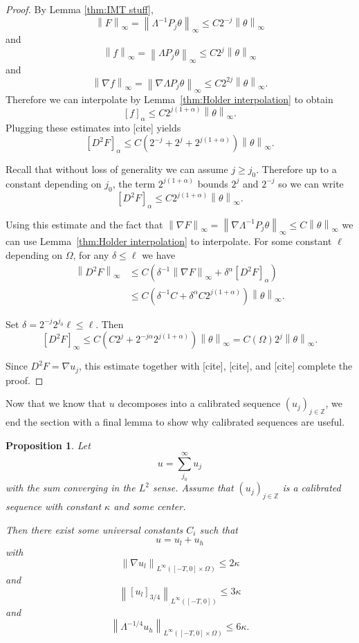 \documentclass[11pt]{amsart}
\newtheorem{proposition}[theorem]{Proposition}
\theoremstyle{remark}
\theoremstyle{definition}
\newcommand{\Z}{\mathbb{Z}}
\newcommand{\norm}[1]{\left\lVert#1\right\rVert}
\newcommand{\paren}[1]{\left( #1 \right)}
\newcommand{\bracket}[1]{\left[ #1 \right]}
\newcommand{\grad}{\nabla}
\newcommand{\n}{^{-1}}
\newcommand{\ulow}{u_l}
\newcommand{\uhigh}{u_h}
\begin{document}
\begin{proof}
By Lemma \ref{thm:IMT stuff},
\[ \norm{F}_\infty = \norm{\Lambda^{-1} P_j \theta}_\infty \leq C 2^{-j} \norm{\theta}_\infty \]
and
\[ \norm{f}_\infty = \norm{\Lambda P_j \theta}_\infty \leq C 2^j \norm{\theta}_\infty \]
and
\[ \norm{\grad f}_\infty = \norm{\grad \Lambda P_j \theta}_\infty \leq C 2^{2j} \norm{\theta}_\infty. \]
Therefore we can interpolate by Lemma~\ref{thm:Holder interpolation} to obtain
\[ \bracket{f}_\alpha \leq C 2^{j(1+\alpha)} \norm{\theta}_\infty. \]
Plugging these estimates into [cite] yields
\[ \bracket{D^2 F}_\alpha \leq C \paren{2^{-j} + 2^j + 2^{j(1+\alpha)}} \norm{\theta}_\infty. \]

Recall that without loss of generality we can assume $j \geq j_0$.  Therefore up to a constant depending on $j_0$, the term $2^{j(1+\alpha)}$ bounds $2^j$ and $2^{-j}$ so we can write
\[ \bracket{D^2 F}_\alpha \leq C 2^{j(1+\alpha)} \norm{\theta}_\infty. \]

Using this estimate and the fact that $\norm{\grad F}_\infty = \norm{\grad \Lambda^{-1} P_j \theta}_\infty \leq C \norm{\theta}_\infty$ we can use Lemma~\ref{thm:Holder interpolation} to interpolate.  For some constant $\ell$ depending on $\Omega$, for any $\delta \leq \ell$ we have
\begin{align*}
\norm{D^2 F}_\infty &\leq C \paren{\delta\n \norm{\grad F}_\infty + \delta^{\alpha} \bracket{D^2 F}_\alpha}
\\ &\leq C \paren{\delta\n C + \delta^\alpha C 2^{j(1+\alpha)}} \norm{\theta}_\infty.  
\end{align*}

Set $\delta = 2^{-j} 2^{j_0} \ell \leq \ell$.  Then
\[ \bracket{D^2 F}_\infty \leq C \paren{C 2^j + 2^{-j\alpha} 2^{j(1+\alpha)}} \norm{\theta}_\infty = C(\Omega) 2^j \norm{\theta}_\infty. \]

Since $D^2 F = \grad u_j$, this estimate together with [cite], [cite], and [cite] complete the proof.  
\end{proof}

Now that we know that $u$ decomposes into a calibrated sequence $(u_j)_{j\in\Z}$, we end the section with a final lemma to show why calibrated sequences are useful.  

\begin{proposition} \label{thm:calibration is good}
Let 
\[ u = \sum_{j_0}^\infty u_j \]
with the sum converging in the $L^2$ sense.  Assume that $(u_j)_{j \in \Z}$ is a calibrated sequence with constant $\kappa$ and some center.  

Then there exist some universal constants $C_i$ such that
\[ u = \ulow + \uhigh \]
with 
\[ \norm{\grad \ulow}_{L^\infty([-T,0]\times \Omega)} \leq 2 \kappa\]
and
\[ \norm{\bracket{\ulow}_{3/4}}_{L^\infty([-T,0])} \leq 3 \kappa \]
and
\[ \norm{\Lambda^{-1/4} \uhigh}_{L^\infty([-T,0]\times\Omega)} \leq 6 \kappa. \]
\end{proposition}
\end{document}
